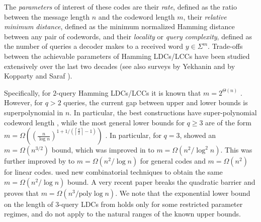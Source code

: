 \documentclass[10pt,a4paper]{article}
\theoremstyle{remark}
\newcommand{\ceil}[1]{\ensuremath{\left\lceil{#1}\right\rceil}\xspace}
\providecommand{\poly}{\ensuremath{\mathrm{poly}}\xspace}
\begin{document}
The {\em parameters} of interest of these codes are their {\em  rate}, defined as the ratio between the message length $n$ and the codeword length $m$,  their {\em relative minimum distance}, defined as the minimum normalized Hamming distance between any pair of codewords, and their {\em locality} or {\em query complexity}, defined as the number of queries a decoder makes to a received word  $y\in \Sigma^m$. Trade-offs between the achievable parameters of Hamming LDCs/LCCs have been studied extensively over the last two decades \cite{KerenidisW04, WehnerW05, GoldreichKST06, Woodruff07, Yekhanin08, Yekhanin12, DvirGY11, Efremenko12,GalM12, BhattacharyyaDS16, BhattacharyyaG17, bhattacharyya2017lower, DvirSW17,KoppartyMRS17, BhattacharyyaCG20} (see also surveys by Yekhanin \cite{Yekhanin12} and by Kopparty and Saraf \cite{KoppartyS16}). 

Specifically, for $2$-query Hamming LDCs/LCCs it is known that $m=2^{\Theta(n)}$ \cite{KerenidisW04, GoldreichKST06, Ben-AroyaRW08, bhattacharyya2017lower}. However, for $q>2$ queries, the current gap between upper and lower bounds is superpolynomial in $n$. In particular, the best constructions have super-polynomial codeword length \cite{Yekhanin08,DvirGY11,Efremenko12}, 
while the most general lower bounds for $q\geq 3$ are of the form $m=\Omega((\frac{n}{\log n})^{1+1/(\ceil{\frac{q}{2}}-1)})$ \cite{KatzT00,KerenidisW04}. In particular, for $q=3$, \cite{KatzT00} showed an $m=\Omega(n^{3/2})$ bound, which was improved in \cite{KerenidisW04} to $m=\Omega(n^2/\log^2 n)$. This was further improved by \cite{Woodruff07,Woodruff12} to $m=\Omega(n^2/\log n)$ for general codes and $m=\Omega(n^2)$ for linear codes. \cite{bhattacharyya2017lower} used new combinatorial techniques to obtain the same $m=\Omega(n^2/\log n)$ bound. A very recent paper \cite{AlrabiahGKM} breaks the quadratic barrier and proves that  $m=\Omega(n^3/\poly\log n)$.
 We note that the  exponential lower bound on the length of $3$-query LDCs  from \cite{GalM12}  holds only for some restricted parameter regimes, and do not apply to the natural ranges of the known upper bounds.
\end{document}
